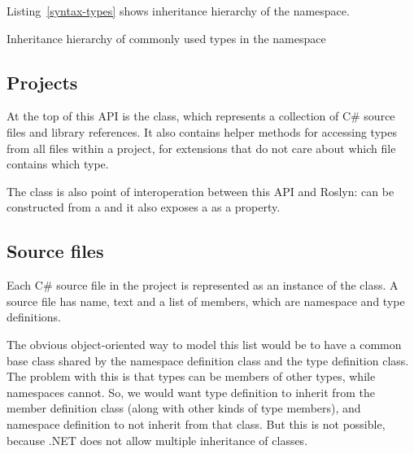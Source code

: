 Listing~\ref{syntax-types} shows inheritance hierarchy of the  namespace.

\begin{listing}
	

\caption{Inheritance hierarchy of commonly used types in the  namespace}
\label{syntax-types}
	
\end{listing}


\subsection{Projects}

At the top of this \ac{API} is the  class, which represents a collection of C\# source files and library references. It also contains helper methods for accessing types from all files within a project, for extensions that do not care about which file contains which type.

The  class is also point of interoperation between this \ac{API} and Roslyn:  can be constructed from a  and it also exposes a  as a property.

\subsection{Source files}

Each C\# source file in the project is represented as an instance of the  class. A source file has name, text and a list of members, which are namespace and type definitions.

\medskip

The obvious object-oriented way to model this list would be to have a common base class shared by the namespace definition class and the type definition class. The problem with this is that types can be members of other types, while namespaces cannot. So, we would want type definition to inherit from the member definition class (along with other kinds of type members), and namespace definition to not inherit from that class. But this is not possible, because .NET does not allow multiple inheritance of classes.

